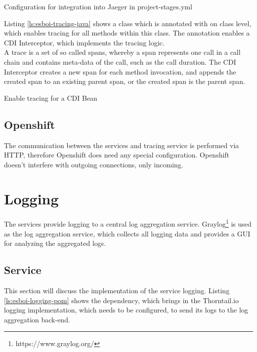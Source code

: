 \begin{listing}[h]
	\caption{Configuration for integration into Jaeger in project-stages.yml}
	\label{ls:esboi-tracing-project-stages}
\end{listing}

Listing \vref{ls:esboi-tracing-java} shows a class which is annotated with  on class level, which enables tracing for all methods within this class. The annotation  enables a CDI Interceptor, which implements the tracing logic. \\

A trace is a set of so called spans, whereby a span represents one call in a call chain and contains meta-data of the call, such as the call duration. The CDI Interceptor creates a new span for each method invocation, and appends the created span to an existing parent span, or the created span is the parent span. 

\begin{listing}[h]
	\caption{Enable tracing for a CDI Bean}
	\label{ls:esboi-tracing-java}
\end{listing}

\subsection{Openshift}
\label{sec:esbi-tracing-openshift}
The communication between the services and tracing service is performed via HTTP, therefore Openshift does need any special configuration. Openshift doesn't interfere with outgoing connections, only incoming.

\section{Logging}
\label{sec:esbi-logging}
The services provide logging to a central log aggregation service. Graylog\footnote{https://www.graylog.org/} is used as the log aggregation service, which collects all logging data and provides a GUI for analyzing the aggregated logs.

\subsection{Service}
\label{sec:esbi-logging-service}
This section will discuss the implementation of the service logging. Listing \vref{ls:esboi-logging-pom} shows the dependency, which brings in the Thorntail.io logging implementation, which needs to be configured, to send its logs to the log aggregation back-end.

